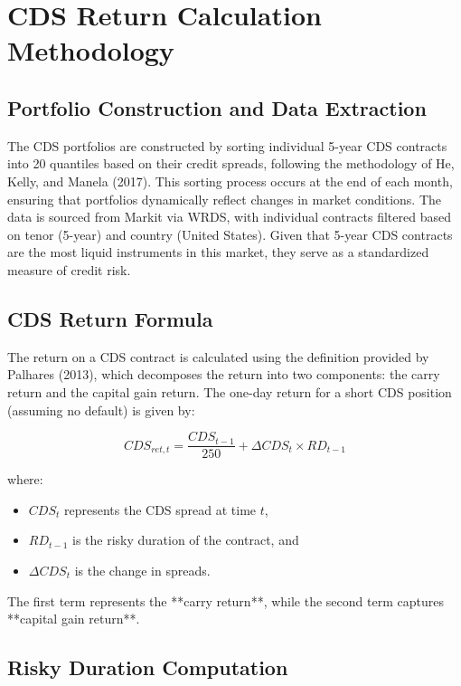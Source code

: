 \documentclass{article}
\begin{document}
\section{CDS Return Calculation Methodology}

\subsection{Portfolio Construction and Data Extraction}

The CDS portfolios are constructed by sorting individual 5-year CDS contracts into 20 quantiles based on their credit spreads, following the methodology of He, Kelly, and Manela (2017). This sorting process occurs at the end of each month, ensuring that portfolios dynamically reflect changes in market conditions. The data is sourced from Markit via WRDS, with individual contracts filtered based on tenor (5-year) and country (United States). Given that 5-year CDS contracts are the most liquid instruments in this market, they serve as a standardized measure of credit risk. \\

\subsection{CDS Return Formula}

The return on a CDS contract is calculated using the definition provided by Palhares (2013), which decomposes the return into two components: the carry return and the capital gain return. The one-day return for a short CDS position (assuming no default) is given by:

\begin{equation}
    CDS_{ret, t} = \frac{CDS_{t-1}}{250} + \Delta CDS_t \times RD_{t-1}
\end{equation}

where:
\begin{itemize}
    \item $CDS_t$ represents the CDS spread at time $t$,
    \item $RD_{t-1}$ is the risky duration of the contract, and
    \item $\Delta CDS_t$ is the change in spreads.
\end{itemize}

The first term represents the **carry return**, while the second term captures **capital gain return**.

\subsection{Risky Duration Computation}
\end{document}
